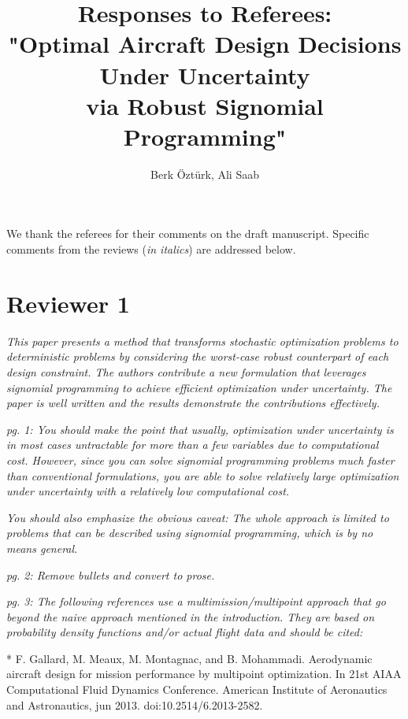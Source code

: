 \documentclass[11pt]{article}
\begin{document}
    \title{Responses to Referees: \\
    "Optimal Aircraft Design Decisions Under Uncertainty \\
    via Robust Signomial Programming"}
    
    \author{Berk \"Ozt\"urk, Ali Saab}

\maketitle

We thank the referees for their comments on the draft manuscript. Specific comments from the reviews (\textit{in italics}) are addressed below. 

\section{Reviewer 1}

\textit{This paper presents a method that transforms stochastic optimization problems to deterministic problems by considering the worst-case robust counterpart of each design constraint. The authors contribute a new formulation that leverages signomial programming to achieve efficient optimization under uncertainty. The paper is well written and the results demonstrate the contributions effectively.}

\textit{pg. 1: You should make the point that usually, optimization under uncertainty is in most cases untractable for more than a few variables due to computational cost. However, since you can solve signomial programming problems much faster than conventional formulations, you are able to solve relatively large optimization under uncertainty with a relatively low computational cost.}

\textit{You should also emphasize the obvious caveat: The whole approach is limited to problems that can be described using signomial programming, which is by no means general.}

\textit{pg. 2: Remove bullets and convert to prose.}

\textit{pg. 3: The following references use a multimission/multipoint approach that go beyond the naive approach mentioned in the introduction. They are based on probability density functions and/or actual flight data and should be cited:}

* F. Gallard, M. Meaux, M. Montagnac, and B. Mohammadi. Aerodynamic aircraft design for mission performance by multipoint optimization. In 21st AIAA Computational Fluid Dynamics Conference. American Institute of Aeronautics and Astronautics, jun 2013. doi:10.2514/6.2013-2582.
\end{document}
